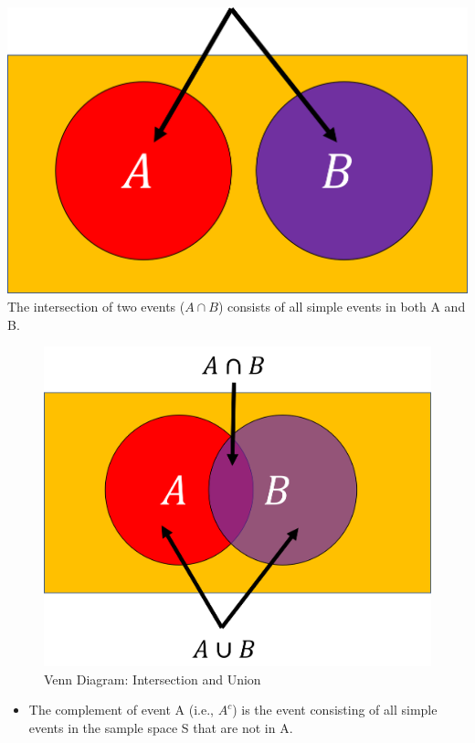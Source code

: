\documentclass[
  letterpaper,
  DIV=11,
  numbers=noendperiod]{scrreprt}
\providecommand{\tightlist}{%
  \setlength{\itemsep}{0pt}\setlength{\parskip}{0pt}}\usepackage{longtable,booktabs,array}
\begin{document}
\includegraphics{Pictures/Ch5/Venn1.png} The intersection of two events
(\(A \cap B\)) consists of all simple events in both A and B.

\begin{figure}[H]

{\centering \includegraphics{Pictures/Ch5/Venn2.png}

}

\caption{Venn Diagram: Intersection and Union}

\end{figure}%

\begin{itemize}
\tightlist
\item
  The complement of event A (i.e., \(A^c\)) is the event consisting of
  all simple events in the sample space S that are not in A.
\end{itemize}
\end{document}
